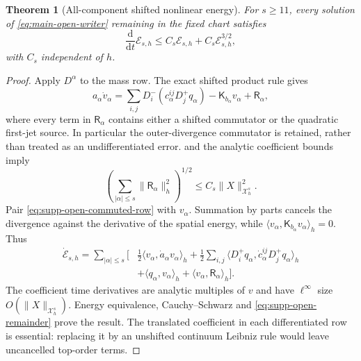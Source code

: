 \documentclass[11pt]{article}
\newtheorem{theorem}{Theorem}[section]
\numberwithin{equation}{section}
\theoremstyle{definition}
\theoremstyle{remark}
\newcommand{\dd}{\mathrm d}
\begin{document}
\begin{theorem}[All-component shifted nonlinear energy]
\label{thm:supp-open-energy}
For $s\ge11$, every solution of \eqref{eq:main-open-writer} remaining in the
fixed chart satisfies
\begin{equation}
 \frac{\dd}{\dd t}\mathscr E_{s,h}
 \le C_s\mathscr E_{s,h}+C_s\mathscr E_{s,h}^{3/2},
 \label{eq:supp-open-energy-inequality}
\end{equation}
with $C_s$ independent of $h$.
\end{theorem}
\begin{proof}
Apply $D^\alpha$ to the mass row.  The exact shifted product rule gives
\begin{equation}
 a_\alpha\dot v_\alpha
 =\sum_{i,j}D_i^-(c_\alpha^{ij}D_j^+q_\alpha)
 -\mathsf K_{b_\alpha}v_\alpha+\mathsf R_\alpha,
 \label{eq:supp-open-commuted-row}
\end{equation}
where every term in $\mathsf R_\alpha$ contains either a shifted commutator
or the quadratic first-jet source.  In particular the outer-divergence
commutator is retained, rather than treated as an undifferentiated error.
 and the analytic coefficient bounds imply
\begin{equation}
 \left(\sum_{|\alpha|\le s}\|\mathsf R_\alpha\|_h^2\right)^{1/2}
 \le C_s\|X\|_{\mathcal X_h^s}^2.
 \label{eq:supp-open-remainder}
\end{equation}
Pair \eqref{eq:supp-open-commuted-row} with $v_\alpha$.
Summation by parts cancels the divergence against the derivative of the
spatial energy, while
$\langle v_\alpha,\mathsf K_{b_\alpha}v_\alpha\rangle_h=0$.  Thus
\begin{equation}
 \begin{split}
 \dot{\mathscr E}_{s,h}=\sum_{|\alpha|\le s}\bigg[&
 \tfrac12\langle v_\alpha,\dot a_\alpha v_\alpha\rangle_h
 +\tfrac12\sum_{i,j}\langle D_i^+q_\alpha,
          \dot c_\alpha^{ij}D_j^+q_\alpha\rangle_h\\
 &+\langle q_\alpha,v_\alpha\rangle_h
 +\langle v_\alpha,\mathsf R_\alpha\rangle_h\bigg].
 \end{split}
 \label{eq:supp-open-energy-identity}
\end{equation}
The coefficient time derivatives are analytic multiples of $v$ and have
$\ell^\infty$ size $O(\|X\|_{\mathcal X_h^s})$.  Energy equivalence,
Cauchy--Schwarz and \eqref{eq:supp-open-remainder} prove the result.  The
translated coefficient in each differentiated row is essential: replacing
it by an unshifted continuum Leibniz rule would leave uncancelled top-order
terms.
\end{proof}
\end{document}
